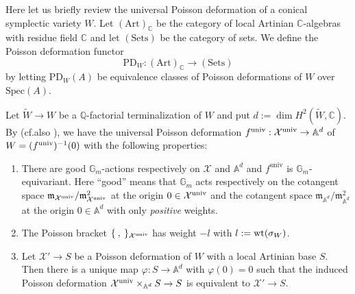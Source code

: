 \documentclass[12pt,a4paper]{amsart}
\theoremstyle{remark}
\theoremstyle{definition}
\def\dim{\operatorname{dim}}
\def\C{\mathbb{C}}
\def\G{\mathbb{G}}
\def\A{\mathbb{A}}
\begin{document}

Here let us briefly review the universal Poisson deformation of a conical symplectic variety $W$. Let $(\mathrm{Art})_{\C}$ be the category of local Artinian $\C$-algebras with residue field $\C$ and let $(\mathrm{Sets})$ be the category of sets. We define the Poisson 
deformation functor  $$\mathrm{PD}_W: (\mathrm{Art})_{\C} \to (\mathrm{Sets})$$ 
by letting $\mathrm{PD}_W(A)$  be equivalence classes of Poisson deformations of $W$ over 
$\mathrm{Spec}(A)$. 

Let $\tilde{W} \to W$ be a $\mathbb{Q}$-factorial terminalization of $W$ and put 
$d := \dim H^2(\tilde{W}, \mathbb{C})$. 
By \cite[\S 5]{Namb} (cf.also \cite[Theorem (2.1)]{Namg}), we have the universal Poisson deformation $f^{\rm univ}: \mathcal{X}^{\rm univ} \to \A^d$ of $W = (f^{\rm univ})^{-1}(0)$ with 
the following properties: \vspace{0.2cm}

\begin{enumerate}
\item There are good $\G_m$-actions respectively on $\mathcal{X}$ and $\A^d$ and $f^{\mathrm{univ}}$ is 
$\G_m$-equivariant. Here ``good'' means that $\G_m$ acts respectively on the cotangent space 
$\mathfrak{m}_{{\mathcal X}^{\rm univ}}/\mathfrak{m}^2_{{\mathcal X}^{\rm univ}}$ at the origin $0 \in \mathcal{X}^{\rm univ}$ and 
the cotangent space $\mathfrak{m}_{\A^d}/\mathfrak{m}^2_{\A^d}$ at the origin $0 \in \A^d$ with only {\em positive} weights. 

\item The Poisson bracket $\{\:, \:\}_{\mathcal{X}^{\rm univ}}$ has weight $-l$ with $l := {\rm wt}(\sigma_W)$. 

\item Let $\mathcal{X}' \to S$ be a Poisson deformation of $W$ with a local Artinian base $S$. Then there is a unique map 
$\varphi: S \to \A^d$ with $\varphi (0) = 0$ such that the induced Poisson deformation 
$\mathcal{X}^{\rm univ}\times_{\A^d}S \to S$ is equivalent to $\mathcal{X}' \to S$.  
\end{enumerate}
\end{document}

